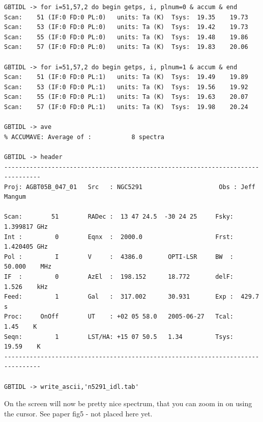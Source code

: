 \documentclass[12pt,a4paper]{article}
\begin{document}
\begin{lstlisting}
GBTIDL -> for i=51,57,2 do begin getps, i, plnum=0 & accum & end  
Scan:    51 (IF:0 FD:0 PL:0)   units: Ta (K)  Tsys:  19.35    19.73
Scan:    53 (IF:0 FD:0 PL:0)   units: Ta (K)  Tsys:  19.42    19.73
Scan:    55 (IF:0 FD:0 PL:0)   units: Ta (K)  Tsys:  19.48    19.86
Scan:    57 (IF:0 FD:0 PL:0)   units: Ta (K)  Tsys:  19.83    20.06

GBTIDL -> for i=51,57,2 do begin getps, i, plnum=1 & accum & end  
Scan:    51 (IF:0 FD:0 PL:1)   units: Ta (K)  Tsys:  19.49    19.89
Scan:    53 (IF:0 FD:0 PL:1)   units: Ta (K)  Tsys:  19.56    19.92
Scan:    55 (IF:0 FD:0 PL:1)   units: Ta (K)  Tsys:  19.63    20.07
Scan:    57 (IF:0 FD:0 PL:1)   units: Ta (K)  Tsys:  19.98    20.24

GBTIDL -> ave
% ACCUMAVE: Average of :           8 spectra

GBTIDL -> header
--------------------------------------------------------------------------------
Proj: AGBT05B_047_01   Src   : NGC5291                     Obs : Jeff Mangum    

Scan:        51        RADec :  13 47 24.5  -30 24 25     Fsky:   1.399817 GHz
Int :         0        Eqnx  :  2000.0                    Frst:   1.420405 GHz
Pol :         I        V     :  4386.0       OPTI-LSR     BW  :  50.000    MHz
IF  :         0        AzEl  :  198.152      18.772       delF:   1.526    kHz
Feed:         1        Gal   :  317.002      30.931       Exp :  429.7     s
Proc:     OnOff        UT    : +02 05 58.0   2005-06-27   Tcal:    1.45    K
Seqn:         1        LST/HA: +15 07 50.5   1.34         Tsys:   19.59    K
--------------------------------------------------------------------------------

GBTIDL -> write_ascii,'n5291_idl.tab'
\end{lstlisting}

On the screen will now be pretty nice spectrum, that you can zoom in on using
the cursor. See paper fig5 - not placed here yet.
\end{document}
